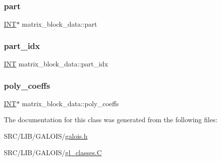 \subsubsection{\texorpdfstring{part}{part}}
{\footnotesize\ttfamily \mbox{\hyperlink{galois_8h_a09fddde158a3a20bd2dcadb609de11dc}{I\+NT}}$\ast$ matrix\+\_\+block\+\_\+data\+::part}

\mbox{\label{classmatrix__block__data_a73d525a1e41135491814a85e5e3b5bd4}} 
\subsubsection{\texorpdfstring{part\+\_\+idx}{part\_idx}}
{\footnotesize\ttfamily \mbox{\hyperlink{galois_8h_a09fddde158a3a20bd2dcadb609de11dc}{I\+NT}} matrix\+\_\+block\+\_\+data\+::part\+\_\+idx}

\mbox{\label{classmatrix__block__data_a88d446c8ef6f98ac6c977e8fb13601f4}} 
\subsubsection{\texorpdfstring{poly\+\_\+coeffs}{poly\_coeffs}}
{\footnotesize\ttfamily \mbox{\hyperlink{galois_8h_a09fddde158a3a20bd2dcadb609de11dc}{I\+NT}}$\ast$ matrix\+\_\+block\+\_\+data\+::poly\+\_\+coeffs}



The documentation for this class was generated from the following files\+:\begin{DoxyCompactItemize}
\item 
S\+R\+C/\+L\+I\+B/\+G\+A\+L\+O\+I\+S/\mbox{\hyperlink{galois_8h}{galois.\+h}}\item 
S\+R\+C/\+L\+I\+B/\+G\+A\+L\+O\+I\+S/\mbox{\hyperlink{gl__classes_8_c}{gl\+\_\+classes.\+C}}\end{DoxyCompactItemize}
